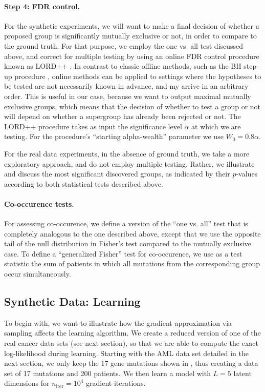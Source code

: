 \paragraph{Step 4: FDR control.}
For the synthetic experiments, we will want to make a final decision of whether a proposed group is significantly mutually exclusive or not, in order to compare to the ground truth.
For that purpose, we employ the one vs. all test discussed above, and correct for multiple testing by using an online FDR control procedure known as LORD++ \citep{lordpp,lord}.
In contrast to classic offline methods, such as the BH step-up procedure \citep{bh}, online methods can be applied to settings where the hypotheses to be tested are not necessarily known in advance, and my arrive in an arbitrary order.
This is useful in our case, because we want to output maximal mutually exclusive groups, which means that the decision of whether to test a group or not will depend on whether a supergroup has already been rejected or not.
The LORD++ procedure takes as input the significance level $\alpha$ at which we are testing.
For the procedure's ``starting alpha-wealth'' parameter we use $W_0 = 0.8\alpha$.

For the real data experiments, in the absence of ground truth, we take a more exploratory approach, and do not employ multiple testing.
Rather, we illustrate and discuss the most significant discovered groups, as indicated by their $p$-values according to both statistical tests described above.

\paragraph{Co-occurence tests.}
For assessing co-occurence, we define a version of the ``one vs. all'' test that is completely analogous to the one described above, except that we use the opposite tail of the null distribution in Fisher's test compared to the mutually exclusive case.
To define a ``generalized Fisher'' test for co-occurence, we use as a test statistic the sum of patients in which all mutations from the corresponding group occur simultaneously.


\subsection{Synthetic Data: Learning}
To begin with, we want to illustrate how the gradient approximation via sampling affects the learning algorithm.
We create a reduced version of one of the real cancer data sets (see next section), so that we are able to compute the exact log-likelihood during learning.
Starting with the AML data set detailed in the next section, we only keep the 17 gene mutations shown in , thus creating a data set of 17 mutations and 200 patients.
We then learn a \fldc{} model with $L = 5$ latent dimensions for $n_{\mathrm{iter}} = 10^4$ gradient iterations.

